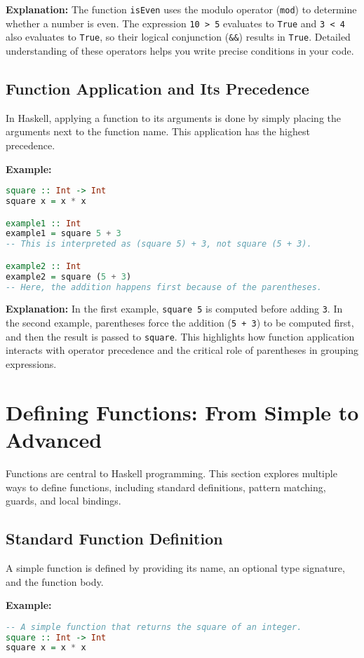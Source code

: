 \documentclass[11pt,a4paper]{article}
\begin{document}
\textbf{Explanation:}  
The function \texttt{isEven} uses the modulo operator (\texttt{mod}) to determine whether a number is even. The expression \texttt{10 > 5} evaluates to \texttt{True} and \texttt{3 < 4} also evaluates to \texttt{True}, so their logical conjunction (\texttt{\&\&}) results in \texttt{True}. Detailed understanding of these operators helps you write precise conditions in your code.

\subsection{Function Application and Its Precedence}
In Haskell, applying a function to its arguments is done by simply placing the arguments next to the function name. This application has the highest precedence.

\textbf{Example:}
\begin{lstlisting}[language=Haskell]
square :: Int -> Int
square x = x * x

example1 :: Int
example1 = square 5 + 3
-- This is interpreted as (square 5) + 3, not square (5 + 3).

example2 :: Int
example2 = square (5 + 3)
-- Here, the addition happens first because of the parentheses.
\end{lstlisting}

\textbf{Explanation:}  
In the first example, \texttt{square 5} is computed before adding \texttt{3}. In the second example, parentheses force the addition (\texttt{5 + 3}) to be computed first, and then the result is passed to \texttt{square}. This highlights how function application interacts with operator precedence and the critical role of parentheses in grouping expressions.

\section{Defining Functions: From Simple to Advanced}
Functions are central to Haskell programming. This section explores multiple ways to define functions, including standard definitions, pattern matching, guards, and local bindings.

\subsection{Standard Function Definition}
A simple function is defined by providing its name, an optional type signature, and the function body.

\textbf{Example:}
\begin{lstlisting}[language=Haskell]
-- A simple function that returns the square of an integer.
square :: Int -> Int
square x = x * x
\end{lstlisting}
\end{document}
